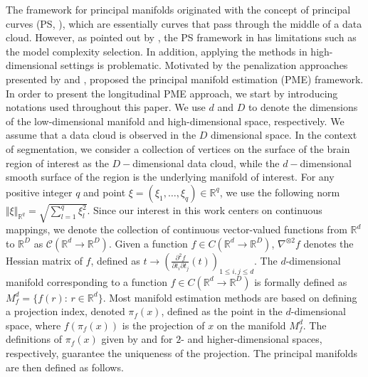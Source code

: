 \documentclass[11pt,reqno]{article}
\theoremstyle{definition}
\begin{document}
The framework for principal manifolds originated with the concept of principal curves (PS, \cite{hastiePrincipalCurves1989}), which are essentially curves that pass through the middle of a data cloud. However, as pointed out by \cite{duchamp1996extremal}, the PS framework in \cite{hastiePrincipalCurves1989} has limitations such as the model complexity selection. In addition, applying the methods in high-dimensional settings is problematic. Motivated by the penalization approaches presented by \cite{kegl2000learning} and \cite{smolaRegularizedPrincipalManifolds2001}, \cite{mengPrincipalManifoldEstimation2021} proposed the principal manifold estimation (PME) framework. In order to present the longitudinal PME approach, we start by introducing notations used throughout this paper. We use $d$ and $D$ to denote the dimensions of the low-dimensional manifold and high-dimensional space, respectively. We assume that a data cloud is observed in the $D$ dimensional space. In the context of segmentation, we consider a collection of vertices on the surface of the brain region of interest as the $D-$dimensional data cloud, while the $d-$dimensional smooth surface of the region is the underlying manifold of interest. For any positive integer $q$ and point $\xi=(\xi_1,\ldots,\xi_q)\in\mathbb{R}^q$, we use the following norm $\Vert \xi\Vert_{\mathbb{R}^q}=\sqrt{\sum_{l=1}^q \xi_l^2}$. Since our interest in this work centers on continuous mappings, we denote the collection of continuous vector-valued functions from $\mathbb{R}^d$ to $\mathbb{R}^D$ as $\mathcal{C}(\mathbb{R}^{d} \to \mathbb{R}^{D})$. Given a function $f \in C(\mathbb{R}^{d} \to \mathbb{R}^{D})$, $\nabla^{\otimes 2} f$ denotes the Hessian matrix of $f$, defined as $t \to \left( \frac{\partial ^2 f}{\partial t_i \partial t_j}(t) \right)_{1 \leq i, j \leq d}$. The $d$-dimensional manifold corresponding to a function $f \in C(\mathbb{R}^{d} \to \mathbb{R}^{D})$ is formally defined as $M_f^d=\{f(r):\,r\in\mathbb{R}^d\}$. Most manifold estimation methods are based on defining a projection index, denoted $\pi_f(x)$, defined as the point in the $d$-dimensional space, where $f(\pi_f(x))$ is the projection of $x$ on the manifold $M_f^d$. The definitions of $\pi_f(x)$ given by \cite{hastiePrincipalCurves1989} and \cite{mengPrincipalManifoldEstimation2021} for $2$- and higher-dimensional spaces, respectively, guarantee the uniqueness of the projection. The principal manifolds are then defined as follows.
\end{document}
